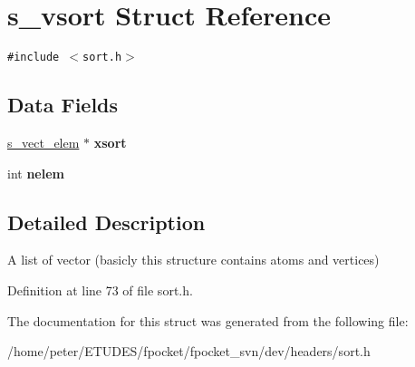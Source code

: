 \hypertarget{structs__vsort}{
\section{s\_\-vsort Struct Reference}
\label{structs__vsort}
}
{\tt \#include $<$sort.h$>$}

\subsection*{Data Fields}
\begin{CompactItemize}
\item 
\hypertarget{structs__vsort_fea6a2eedfb487567f7862273ba26d2c}{
\hyperlink{structs__vect__elem}{s\_\-vect\_\-elem} $\ast$ \textbf{xsort}}
\label{structs__vsort_fea6a2eedfb487567f7862273ba26d2c}

\item 
\hypertarget{structs__vsort_de445c6ef700258e18810d3cf0dd5c76}{
int \textbf{nelem}}
\label{structs__vsort_de445c6ef700258e18810d3cf0dd5c76}

\end{CompactItemize}


\subsection{Detailed Description}
A list of vector (basicly this structure contains atoms and vertices) 

Definition at line 73 of file sort.h.

The documentation for this struct was generated from the following file:\begin{CompactItemize}
\item 
/home/peter/ETUDES/fpocket/fpocket\_\-svn/dev/headers/sort.h\end{CompactItemize}
